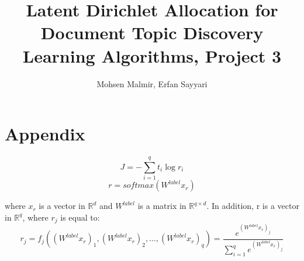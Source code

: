 \documentclass[twoside,12pt]{article}
\begin{document}
\title{Latent Dirichlet Allocation for Document Topic Discovery\\  Learning Algorithms, Project 3}
\author{Mohsen Malmir, Erfan Sayyari}
\maketitle

\section{Appendix}
\begin{equation}
J = -\sum_{i=1}^{q}t_i\log{r_i}
\end{equation}
\begin{equation}
r = softmax(W^{label}x_r)
\end{equation}

where $x_r$ is a vector in $\mathbb{R}^d$ and $W^{label}$ is a matrix in $\mathbb{R}^{q\times d}$. In addition, r is a vector in $\mathbb{R}^q$, where $r_j$ is equal to:
\begin{equation}
r_j=f_j((W^{label}x_r)_1,(W^{label}x_r)_2,\ldots,(W^{label}x_r)_q)=\frac{e^{(W^{label}x_r)_j}}{\sum_{i=1}^{q}e^{(W^{label}x_r)_j}}
\end{equation}
\end{document}
